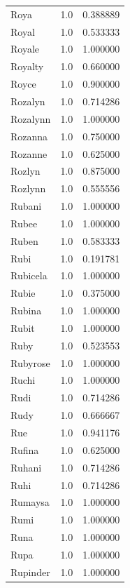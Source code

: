 \documentclass[
  letterpaper,
  DIV=11,
  numbers=noendperiod]{scrreprt}
\begin{document}
\begin{tabular}{lrr}
Roya            &   1.0 &   0.388889 \\
Royal           &   1.0 &   0.533333 \\
Royale          &   1.0 &   1.000000 \\
Royalty         &   1.0 &   0.660000 \\
Royce           &   1.0 &   0.900000 \\
Rozalyn         &   1.0 &   0.714286 \\
Rozalynn        &   1.0 &   1.000000 \\
Rozanna         &   1.0 &   0.750000 \\
Rozanne         &   1.0 &   0.625000 \\
Rozlyn          &   1.0 &   0.875000 \\
Rozlynn         &   1.0 &   0.555556 \\
Rubani          &   1.0 &   1.000000 \\
Rubee           &   1.0 &   1.000000 \\
Ruben           &   1.0 &   0.583333 \\
Rubi            &   1.0 &   0.191781 \\
Rubicela        &   1.0 &   1.000000 \\
Rubie           &   1.0 &   0.375000 \\
Rubina          &   1.0 &   1.000000 \\
Rubit           &   1.0 &   1.000000 \\
Ruby            &   1.0 &   0.523553 \\
Rubyrose        &   1.0 &   1.000000 \\
Ruchi           &   1.0 &   1.000000 \\
Rudi            &   1.0 &   0.714286 \\
Rudy            &   1.0 &   0.666667 \\
Rue             &   1.0 &   0.941176 \\
Rufina          &   1.0 &   0.625000 \\
Ruhani          &   1.0 &   0.714286 \\
Ruhi            &   1.0 &   0.714286 \\
Rumaysa         &   1.0 &   1.000000 \\
Rumi            &   1.0 &   1.000000 \\
Runa            &   1.0 &   1.000000 \\
Rupa            &   1.0 &   1.000000 \\
Rupinder        &   1.0 &   1.000000 \\

\end{tabular}
\end{document}
